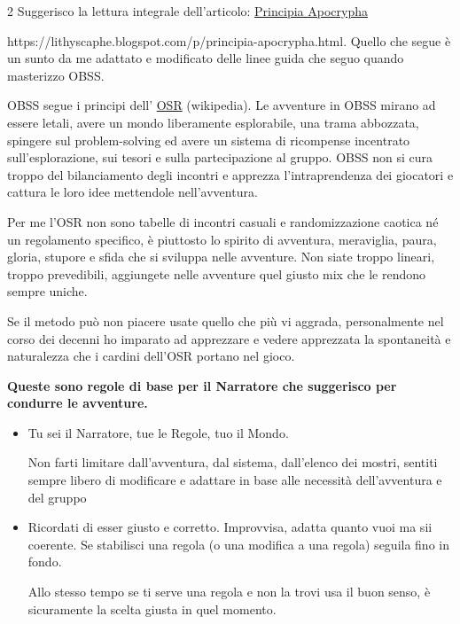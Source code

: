 \begin{multicols}{2}
Suggerisco la lettura integrale dell'articolo: \href{https://lithyscaphe.blogspot.com/p/principia-apocrypha.html} {Principia Apocrypha}

https://lithyscaphe.blogspot.com/p/principia-apocrypha.html. Quello che segue è un sunto da me adattato e modificato delle linee guida che seguo quando masterizzo OBSS.

OBSS segue i principi dell' \href{https://it.wikipedia.org/wiki/Old_School_Renaissance}{OSR} (wikipedia). Le avventure in OBSS mirano ad essere letali, avere un mondo liberamente esplorabile, una trama abbozzata, spingere sul problem-solving ed avere un sistema di ricompense incentrato sull'esplorazione, sui tesori e sulla partecipazione al gruppo. OBSS non si cura troppo del bilanciamento degli incontri e apprezza l'intraprendenza dei giocatori e cattura le loro idee mettendole nell'avventura.

Per me l'OSR non sono tabelle di incontri casuali e randomizzazione caotica né un regolamento specifico, è piuttosto lo spirito di avventura, meraviglia, paura, gloria, stupore e sfida che si sviluppa nelle avventure. Non siate troppo lineari, troppo prevedibili, aggiungete nelle avventure quel giusto mix che le rendono sempre uniche.

Se il metodo può non piacere usate quello che più vi aggrada, personalmente nel corso dei decenni ho imparato ad apprezzare e vedere apprezzata la spontaneità e naturalezza che i cardini dell'OSR portano nel gioco.

\bigskip

\textbf{Queste sono regole di base per il Narratore che suggerisco per condurre le avventure.}

\medskip

\begin{itemize}[leftmargin=*] \setlength{\itemsep}{0pt}

\item
Tu sei il Narratore, tue le Regole, tuo il Mondo.

Non farti limitare dall'avventura, dal sistema, dall'elenco dei mostri, sentiti sempre libero di modificare e adattare in base alle necessità dell'avventura e del gruppo

\item
Ricordati di esser giusto e corretto. Improvvisa, adatta quanto vuoi ma sii coerente. Se stabilisci una regola (o una modifica a una regola) seguila fino in fondo.

Allo stesso tempo se ti serve una regola e non la trovi usa il buon senso, è sicuramente la scelta giusta in quel momento.


\end{itemize}
\end{multicols}
